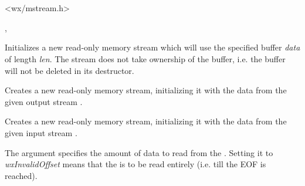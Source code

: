\section{}\label{wxmeminputstream}




<wx/mstream.h>




, 


\label{wxmemoryinputstreamctor}


Initializes a new read-only memory stream which will use the specified buffer
{\it data} of length {\it len}. The stream does not take ownership of the 
buffer, i.e. the buffer will not be deleted in its destructor.


Creates a new read-only memory stream, initializing it with the
data from the given output stream .


Creates a new read-only memory stream, initializing it with the
data from the given input stream .

The  argument specifies the amount of data to read from
the . Setting it to {\it wxInvalidOffset} means that
the  is to be read entirely (i.e. till the EOF is reached).


\label{wxmemoryinputstreamdtor}

